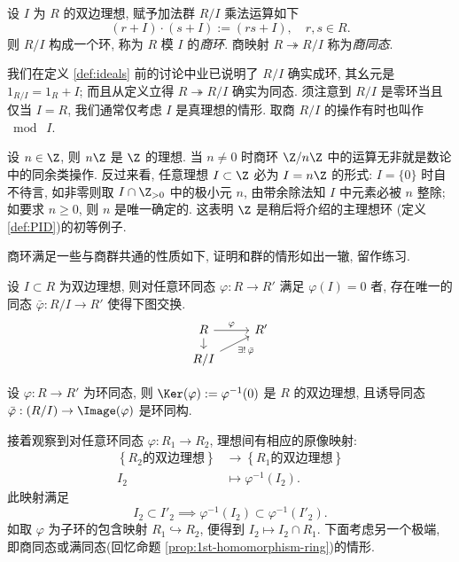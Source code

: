 \begin{definition}
	设 $I$ 为 $R$ 的双边理想, 赋予加法群 $R/I$ 乘法运算如下
	\[ (r+I) \cdot (s+I) := (rs + I), \quad r, s \in R. \]
	则 $R/I$ 构成一个环, 称为 $R$ 模 $I$ 的\emph{商环}. 商映射 $R \twoheadrightarrow R/I$ 称为\emph{商同态}.
\end{definition}
我们在定义 \ref{def:ideals} 前的讨论中业已说明了 $R/I$ 确实成环, 其幺元是 $1_{R/I} = 1_R + I$; 而且从定义立得 $R \twoheadrightarrow R/I$ 确实为同态. 须注意到 $R/I$ 是零环当且仅当 $I=R$, 我们通常仅考虑 $I$ 是真理想的情形. 取商 $R/I$ 的操作有时也叫作 $\bmod \;I$.

\begin{example}\label{eg:Z-pid}
	设 $n \in \Z$, 则 $n\Z$ 是 $\Z$ 的理想. 当 $n \neq 0$ 时商环 $\Z/n\Z$ 中的运算无非就是数论中的同余类操作. 反过来看, 任意理想 $I \subset \Z$ 必为 $I=n\Z$ 的形式: $I=\{0\}$ 时自不待言, 如非零则取 $I \cap \Z_{> 0}$ 中的极小元 $n$, 由带余除法知 $I$ 中元素必被 $n$ 整除; 如要求 $n \geq 0$, 则 $n$ 是唯一确定的. 这表明 $\Z$ 是稍后将介绍的主理想环 (定义 \ref{def:PID})的初等例子.
\end{example}

商环满足一些与商群共通的性质如下, 证明和群的情形如出一辙, 留作练习.
\begin{proposition}\label{prop:quotient-ring-univ-prop}
	设 $I \subset R$ 为双边理想, 则对任意环同态 $\varphi: R \to R'$ 满足 $\varphi(I)=0$ 者, 存在唯一的同态 $\bar{\varphi}: R/I \to R'$ 使得下图交换.
	\[ \begin{tikzcd}[row sep=small]
		R \arrow[r, "\varphi"] \arrow[d] & R' \\
		R/I \arrow[ur, "{\exists! \,\bar{\varphi}}"'] &
	\end{tikzcd} \]
\end{proposition}

\begin{proposition}\label{prop:1st-homomorphism-ring}
	设 $\varphi: R \to R'$ 为环同态, 则 $\Ker(\varphi) := \varphi^{-1}(0)$ 是 $R$ 的双边理想, 且诱导同态 $\bar{\varphi}: (R/I) \to \Image(\varphi)$ 是环同构.
\end{proposition}

接着观察到对任意环同态 $\varphi: R_1 \to R_2$, 理想间有相应的原像映射:
\begin{equation}\label{eqn:ideal-preimage}\begin{aligned}
	\left\{ R_2 \text{的双边理想} \right\} & \longrightarrow \left\{ R_1 \text{的双边理想} \right\} \\
	I_2 & \longmapsto \varphi^{-1}(I_2).
\end{aligned}\end{equation}
此映射满足
\[ I_2 \subset I'_2 \implies \varphi^{-1}(I_2) \subset \varphi^{-1}(I'_2). \]
如取 $\varphi$ 为子环的包含映射 $R_1 \hookrightarrow R_2$, 便得到 $I_2 \mapsto I_2 \cap R_1$. 下面考虑另一个极端, 即商同态或满同态(回忆命题 \ref{prop:1st-homomorphism-ring})的情形.

